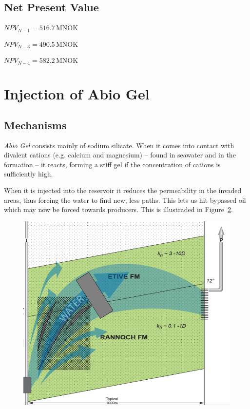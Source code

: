 \documentclass[final]{beamer}
\begin{document}
\begin{frame}
\begin{multicols}{3}
\begin{figure}[H]
  
  \caption{}
  \label{fig:new_wells_field}
\end{figure}


\subsection{Net Present Value} %

\begin{center}
  $NPV_{N-1} = 516.7 \, \mathrm{MNOK}$

  $NPV_{N-3} = 490.5 \, \mathrm{MNOK}$

  $NPV_{N-4} = 582.2 \, \mathrm{MNOK}$
\end{center}









\section{Injection of Abio Gel} %

\subsection{Mechanisms} %
\emph{Abio Gel} consists mainly of sodium silicate. When it comes into contact with divalent cations (e.g. calcium and magnesium) -- found in seawater and in the formation -- it reacts, forming a stiff gel if the concentration of cations is sufficiently high.

When it is injected into the reservoir it reduces the permeability in the invaded areas, thus forcing the water to find new, less paths. This lets us hit bypassed oil which may now be forced towards producers. This is illustraded in Figure~\ref{fig:abio_gel}.

\begin{figure}[H]
  \centering
  \includegraphics[width=0.5\columnwidth]{images/abio_gel.png}
  \caption{}
  \label{fig:abio_gel}
\end{figure}



\end{multicols}
\end{frame}
\end{document}
